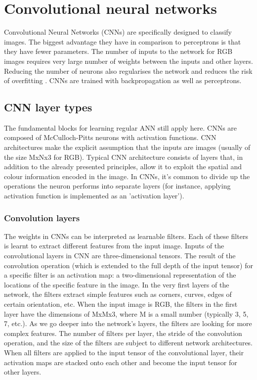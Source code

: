 \section{Convolutional neural networks}

Convolutional Neural Networks (CNNs) are specifically designed to classify images. The biggest advantage they have in comparison to perceptrons is that they have fewer parameters. The number of inputs to the network for RGB images requires very large number of weights between the inputs and other layers. Reducing the number of neurons also regularises the network and reduces the risk of overfitting \cite{mehlig}. CNNs are trained with backpropagation as well as perceptrons. 

\subsection{CNN layer types}
The fundamental blocks for learning regular ANN still apply here. CNNs are composed of McCulloch-Pitts neurons with activation functions. CNN architectures make the explicit assumption that the inputs are images (usually of the size MxNx3 for RGB). Typical CNN architecture consists of layers that, in addition to the already presented principles, allow it to exploit the spatial and colour information encoded in the image. \cite{stanford-github} In CNNs, it's common to divide up the operations the neuron performs into separate layers (for instance, applying activation function is implemented as an 'activation layer').

\subsubsection{Convolution layers}  

The weights in CNNs can be interpreted as learnable filters. Each of these filters is learnt to extract different features from the input image. Inputs of the convolutional layers in CNN are three-dimensional tensors. The result of the convolution operation (which is extended to the full depth of the input tensor) for a specific filter is an activation map: a two-dimensional representation of the locations of the specific feature in the image. In the very first layers of the network, the filters extract simple features such as corners, curves, edges of certain orientation, etc. When the input image is RGB, the filters in the first layer have the dimensions of MxMx3, where M is a small number (typically 3, 5, 7, etc.). As we go deeper into the network's layers, the filters are looking for more complex features. The number of filters per layer, the stride of the convolution operation, and the size of the filters are subject to different network architectures. When all filters are applied to the input tensor of the convolutional layer, their activation maps are stacked onto each other and become the input tensor for other layers. \cite{stanford-github}

